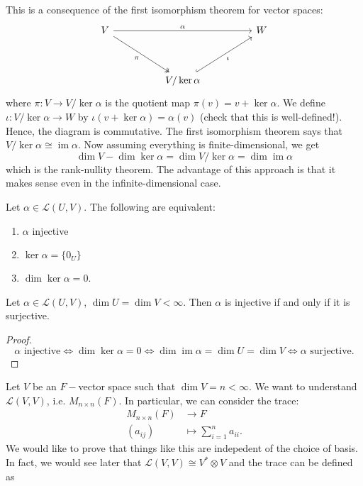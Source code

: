 \documentclass{scrartcl}
\def\L{\mathcal{L}}
\DeclareMathOperator{\im}{im}
\begin{document}
\begin{remark}
	This is a consequence of the first isomorphism theorem for vector spaces:
	\[\begin{tikzcd}
		V &&&& W \\
		\\
		&& {V/\ker{\alpha}}
		\arrow["\alpha", from=1-1, to=1-5]
		\arrow["\pi"', two heads, from=1-1, to=3-3]
		\arrow["\iota"', hook, from=3-3, to=1-5]
	\end{tikzcd}\]
	where $\pi: V \to V/\ker{\alpha}$ is the quotient map $\pi(v) = v+\ker{\alpha}$. 
	We define $\iota: V/\ker{\alpha} \to  W$ by $\iota(v+\ker{\alpha}) = \alpha(v)$ (check that this is well-defined!). Hence, the diagram is commutative. The first isomorphism theorem says that $V/\ker{\alpha} \cong \im{\alpha}$. Now assuming everything is finite-dimensional, we get 
	\[\dim{V}-\dim{\ker{\alpha}} = \dim{V/\ker{\alpha}} = \dim{\im{\alpha}}\]
	which is the rank-nullity theorem. The advantage of this approach is that it makes sense even in the infinite-dimensional case. 
\end{remark}
\begin{corollary}
	Let $\alpha \in \L(U, V)$. The following are equivalent:
	\begin{enumerate}
		\item $\alpha$ injective
		\item $\ker{\alpha} = \{0_U\}$
		\item $\dim \ker {\alpha} = 0$. 
	\end{enumerate}
\end{corollary}
\begin{proposition}
	Let $\alpha \in \L(U, V)$, $\dim U = \dim V < \infty$. Then $\alpha$ is injective if and only if it is surjective.
\end{proposition}
\begin{proof}
	\[\alpha \text{ injective} \iff \dim \ker {\alpha} = 0 \iff \dim \im{\alpha} = \dim U = \dim V \iff \alpha \text{ surjective}.\]
\end{proof}
Let $V$ be an $F-$vector space such that $\dim{V} = n < \infty$. We want to understand $\L(V, V)$, i.e. $M_{n \times n}(F)$. In particular, we can consider the trace: 
\begin{align*}
	M_{n \times n}(F) &\to F \\
	(a_{ij}) &\mapsto \sum_{i=1}^n a_{ii}.
\end{align*}
We would like to prove that things like this are indepedent of the choice of basis. In fact, we would see later that $\L(V, V) \cong V^* \otimes V$ and the trace can be defined as 
\end{document}
